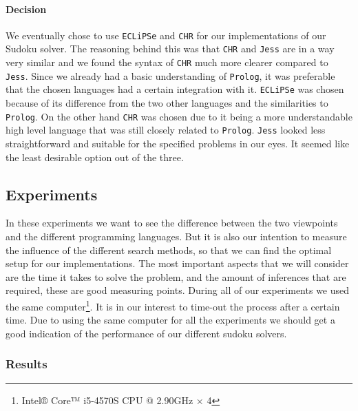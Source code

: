 \paragraph*{Decision}
We eventually chose to use \texttt{ECLiPSe} and \texttt{CHR} for our implementations of our Sudoku solver.
The reasoning behind this was that \texttt{CHR} and \texttt{Jess} are in a way very similar and we found the syntax of \texttt{CHR} much more clearer compared to \texttt{Jess}.
Since we already had a basic understanding of \texttt{Prolog}, it was preferable that the chosen languages had a certain integration with it.
\texttt{ECLiPSe} was chosen because of its difference from the two other languages and the similarities to \texttt{Prolog}.
On the other hand \texttt{CHR} was chosen due to it being a more understandable high level language that was still closely related to \texttt{Prolog}.
\texttt{Jess} looked less straightforward and suitable for the specified problems in our eyes.
It seemed like the least desirable option out of the three.


\subsection{Experiments}\label{subsec:sudokuexperiments}
In these experiments we want to see the difference between the two viewpoints and the different programming languages.
But it is also our intention to measure the influence of the different search methods, so that we can find the optimal setup for our implementations.
The most important aspects that we will consider are the time it takes to solve the problem, and the amount of inferences that are required, these are good measuring points.
During all of our experiments we used the same computer\footnote{Intel® Core™ i5-4570S CPU @ 2.90GHz × 4}.
It is in our interest to time-out the process after a certain time.
Due to using the same computer for all the experiments we should get a good indication of the performance of our different sudoku solvers.

\subsubsection{Results}
